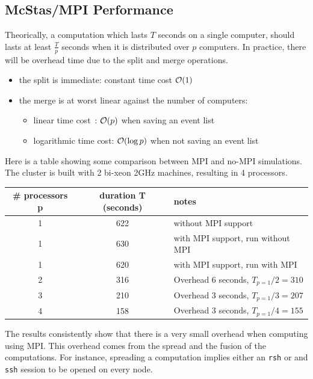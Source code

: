 \subsection{McStas/MPI Performance}

Theorically, a computation which lasts $T$ seconds on a single computer,
should lasts at least $\frac{T}{p}$ seconds when it is distributed
over $p$ computers. In practice, there will be overhead time due to the split
and merge operations.
\begin{itemize}
\item the split is immediate: constant time cost ${\cal O}(1)$
\item the merge is at worst linear against the number of computers:
  \begin{itemize}
  \item linear time cost~: ${\cal O}(p)$ when saving an event list
  \item logarithmic time cost: ${\cal O}(\log{p})$ when not saving an
  event list
  \end{itemize}
\end{itemize}

Here is a table showing some comparison between MPI and no-MPI
simulations. The cluster is built with 2 bi-xeon 2GHz machines,
resulting in 4 processors.
\begin{center}
  \begin{tabular}{|c|c|l|}
    \hline
    \# processors p & duration T (seconds)& notes \\
    \hline
    1 & 622 & without MPI support \\
    1 & 630 & with MPI support, run without MPI \\
    1 & 620 & with MPI support, run with MPI \\
    \hline
    2 & 316 & Overhead 6 seconds, $T_{p=1}/2 = 310$\\
    3 & 210 & Overhead 3 seconds, $T_{p=1}/3 = 207$\\
    4 & 158 & Overhead 3 seconds, $T_{p=1}/4 = 155$\\
    \hline
  \end{tabular}
\end{center}

The results consistently show that there is a very small overhead
when computing using MPI. This overhead comes from the spread and the
fusion of the computations. For instance, spreading a computation
implies either an \verb'rsh' or and \verb'ssh' session to be opened on
every node.

